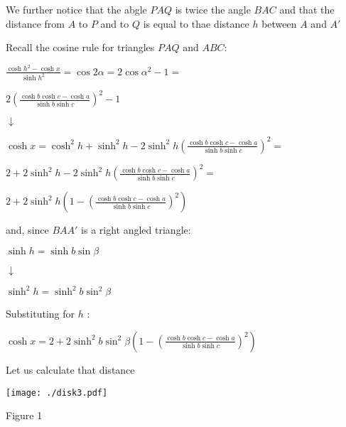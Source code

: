 \documentclass[a4paper,10pt]{article}
\begin{document}
We further notice that the abgle $PAQ$ is twice the angle $BAC$ and that
the distance from $A$ to $P$ and to $Q$ is equal to thae distance $h$ between
$A$ and $A'$

Recall the cosine rule for triangles $PAQ$ and $ABC$:

\begin{center}
$\frac{\cosh{h}^2-\cosh{x}}{\sinh{h}^2}=\cos{2\alpha}=2\cos{\alpha}^2-1=$

$2\left(\frac{\cosh{b}\cosh{c}-\cosh{a}}{\sinh{b}\sinh{c}}\right)^2 - 1$

$\downarrow$

$\cosh{x} = \cosh^2{h} + \sinh^2{h} - 2\sinh^2{h}\left(\frac{\cosh{b}\cosh{c}-\cosh{a}}{\sinh{b}\sinh{c}}\right)^2 =$

$2 + 2\sinh^2{h} - 2\sinh^2{h}\left(\frac{\cosh{b}\cosh{c}-\cosh{a}}{\sinh{b}\sinh{c}}\right)^2 =$

$2 + 2\sinh^2{h}\left(1 - \left(\frac{\cosh{b}\cosh{c}-\cosh{a}}{\sinh{b}\sinh{c}}\right)^2\right)  $

\end{center}

and, since $BAA'$ is a right angled triangle: 

\begin{center}
$\sinh{h}=\sinh{b}\sin{\beta}$

$\downarrow$

$\sinh^2{h}=\sinh^2{b}\sin^2{\beta}$


\end{center}

Substituting for $h$ :

$\cosh{x} = 2 + 2\sinh^2{b}\sin^2{\beta}\left(1 - \left(\frac{\cosh{b}\cosh{c}-\cosh{a}}{\sinh{b}\sinh{c}}\right)^2\right)$








Let us calculate that distance

\begin{center}
 \texttt{[image: ./disk3.pdf]}

 Figure 1
\end{center}
\end{document}
